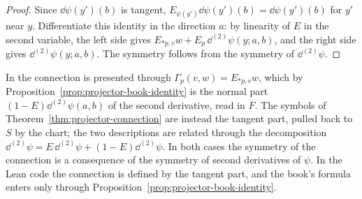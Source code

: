 \begin{proof}
  \leanok
  Since $\dd\psi(y')(b)$ is tangent, $E_{\psi(y')}\dd\psi(y')(b) = \dd\psi(y')(b)$ for $y'$ near
  $y$. Differentiate this identity in the direction $a$: by linearity of $E$ in the second
  variable, the left side gives $E_{*p, v} w + E_p\, \dd^{(2)}\psi(y; a, b)$, and the right side
  gives $\dd^{(2)}\psi(y; a, b)$. The symmetry follows from the symmetry of $\dd^{(2)}\psi$.
\end{proof}

\begin{remark}
  In \cite{Lar22} the connection is presented through $\Gamma_p(v, w) = E_{*p, v} w$, which by
  Proposition~\ref{prop:projector-book-identity} is the normal part $(1 - E)\dd^{(2)}\psi(a, b)$
  of the second derivative, read in $F$. The symbols of
  Theorem~\ref{thm:projector-connection} are instead the tangent part, pulled back to $S$ by the
  chart; the two descriptions are related through the decomposition
  $\dd^{(2)}\psi = E\,\dd^{(2)}\psi + (1 - E)\dd^{(2)}\psi$. In both cases the symmetry of the
  connection is a consequence of the symmetry of second derivatives of $\psi$. In the Lean code
  the connection is defined by the tangent part, and the book's formula enters only through
  Proposition~\ref{prop:projector-book-identity}.
\end{remark}
